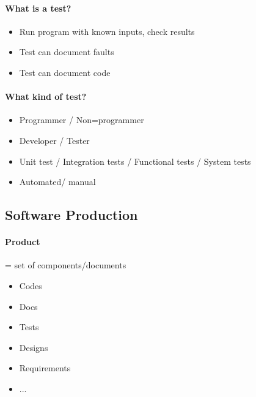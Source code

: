 \documentclass[12pt]{article}
\begin{document}
    \paragraph{What is a test?}
    \begin{itemize}
        \item Run program with known inputs, check results
        \item Test can document faults
        \item Test can document code
    \end{itemize}

    \paragraph{What kind of test?}
    \begin{itemize}
        \item Programmer / Non=programmer
        \item Developer / Tester
        \item Unit test / Integration tests / Functional tests / System tests
        \item Automated/ manual
    \end{itemize}
\subsection{Software Production}
    \paragraph{Product} = set of components/documents
        \begin{itemize}
            \item Codes
            \item Docs
            \item Tests
            \item Designs
            \item Requirements
            \item ... 
        \end{itemize}
\end{document}
